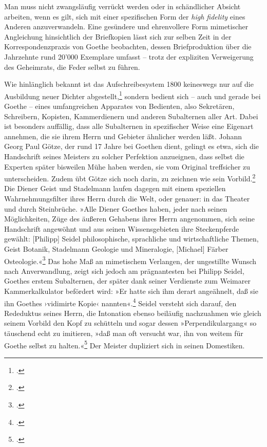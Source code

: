 \documentclass[a4paper,10pt]{article}
\newcommand{\anf}[1]{»#1«}
\newcommand{\inanf}[1]{›#1‹}
\begin{document}
Man muss nicht zwangsläufig verrückt werden oder in schändlicher Absicht arbeiten, wenn es gilt, sich mit einer spezifischen Form der \emph{high fidelity} eines Anderen anzuverwandeln. Eine gesündere und ehrenvollere Form mimetischer Angleichung hinsichtlich der Briefkopien lässt sich zur selben Zeit in der Korrespondenzpraxis von Goethe beobachten, dessen Briefproduktion über die Jahrzehnte rund 20'000 Exemplare umfasst – trotz der expliziten Verweigerung des Geheimrats, die Feder selbst zu führen. 

Wie hinlänglich bekannt ist das Aufschreibesystem 1800 keineswegs nur auf die Ausbildung neuer Dichter abgestellt,\footcite[]{kittler:1995a} sondern bedient sich – auch und gerade bei Goethe – eines umfangreichen Apparates von Bedienten, also Sekretären, Schreibern, Kopisten, Kammerdienern und anderen Subalternen aller Art. Dabei ist besonders auffällig, dass alle Subalternen in spezifischer Weise eine Eigenart annehmen, die sie ihrem Herrn und Gebieter ähnlicher werden läßt. Johann Georg Paul Götze, der rund 17 Jahre bei Goethen dient, gelingt es etwa, sich die Handschrift seines Meisters zu solcher Perfektion anzueignen, dass selbst die Experten später bisweilen Mühe haben werden, sie vom Original treffsicher zu unterscheiden. Zudem übt Götze sich noch darin, zu zeichnen wie sein Vorbild.\footcites[S.~100]{schleif:1965}[Mit dem Bestreben, die Handschrift des Herrn nachzuahmen, stehen Goethes Domestiken keineswegs allein. Auch in den Privatlabors im viktorianischen England, wo die Domestiken zu Laborassistenten werden, findet sich diese Tendenz, so etwa bei Sir William Crookes Diener: \anf{Even Giminghams handwriting became more like Crooke's.}][S.~330]{gay:1996} Die Diener Geist und Stadelmann laufen dagegen mit einem speziellen Wahrnehmungsfilter ihres Herrn durch die Welt, oder genauer: in das Theater und durch Steinbrüche. \anf{Alle Diener Goethes haben, jeder nach seinen Möglichkeiten, Züge des äußeren Gehabens ihres Herrn angenommen, sich seine Handschrift angewöhnt und aus seinen Wissensgebieten ihre Steckenpferde gewählt: [Philipp] Seidel philosophische, sprachliche und wirtschaftliche Themen, Geist Botanik, Stadelmann Geologie und Mineralogie, [Michael] Färber Osteologie.}\footcite[S.~222]{schleif:1965} Das hohe Maß an mimetischem Verlangen, der ungestillte Wunsch nach Anverwandlung, zeigt sich jedoch am prägnantesten bei Philipp Seidel, Goethes erstem Subalternen, der später dank seiner Verdienste zum Weimarer Kammerkalkulator befördert wird: \anf{Er hatte sich ihm derart angeähnelt, daß sie ihn Goethes \inanf{vidimirte Kopie} nannten}.\footcite[S.~28]{schleif:1965} Seidel versteht sich darauf, den Rededuktus seines Herrn, die Intonation ebenso beiläufig nachzuahmen wie gleich seinem Vorbild den Kopf zu schütteln und sogar dessen \anf{Perpendikulargang} so täuschend echt zu imitieren, \anf{daß man oft versucht war, ihn von weitem für Goethe selbst zu halten.}\footcite[S.~47]{lyncker:1912} Der Meister dupliziert sich in seinen Domestiken. 
\end{document}
